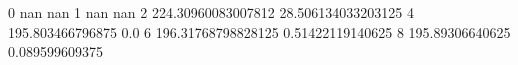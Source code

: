 0 nan nan
1 nan nan
2 224.30960083007812 28.506134033203125
4 195.803466796875 0.0
6 196.31768798828125 0.51422119140625
8 195.89306640625 0.089599609375
